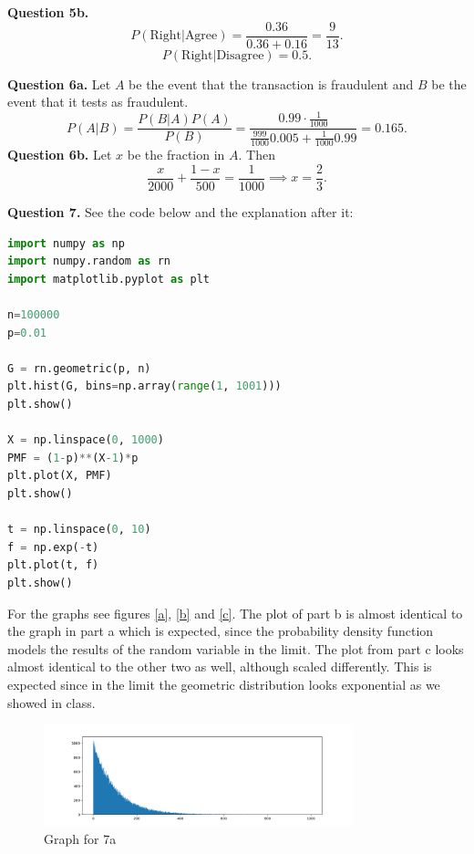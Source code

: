 \documentclass[letterpaper, reqno,11pt]{article}
\begin{document}
{\noindent\bf Question 5b.} 
\[
    P(\text{Right}|\text{Agree})=\frac{0.36}{0.36+0.16}=\frac{9}{13}
.\]
\[
P(\text{Right}|\text{Disagree})=0.5
.\]


{\noindent\bf Question 6a.} Let $A$ be the event that the transaction is fraudulent and $B$ be the event that it tests as fraudulent. 
\[
P(A|B)=\frac{P(B|A)P(A)}{P(B)}=\frac{0.99\cdot \frac{1}{1000}}{\frac{999}{1000}0.005+\frac{1}{1000}0.99}=0.165
.\]
{\noindent\bf Question 6b.} Let $x$ be the fraction in $A$. Then
\[
    \frac{x}{2000}+\frac{1-x}{500}=\frac{1}{1000}\implies x=\frac{2}{3}
.\]

{\noindent\bf Question 7.} See the code below and the explanation after it: 


\begin{lstlisting}[language=Python]
import numpy as np
import numpy.random as rn
import matplotlib.pyplot as plt

n=100000
p=0.01

G = rn.geometric(p, n)
plt.hist(G, bins=np.array(range(1, 1001)))
plt.show()

X = np.linspace(0, 1000)
PMF = (1-p)**(X-1)*p
plt.plot(X, PMF)
plt.show()

t = np.linspace(0, 10)
f = np.exp(-t)
plt.plot(t, f)
plt.show()
\end{lstlisting}

For the graphs see figures \ref{a}, \ref{b} and \ref{c}. The plot of part b is almost identical to the graph in part a which is expected, since the probability density function models the results of the random variable in the limit. The plot from part c looks almost identical to the other two as well, although scaled differently. This is expected since in the limit the geometric distribution looks exponential as we showed in class. 

\begin{figure}[htpb]
    \centering
    \includegraphics[width=0.8\textwidth]{a}
    \caption{Graph for 7a}
    \label{fig:a}
\end{figure}
\end{document}
